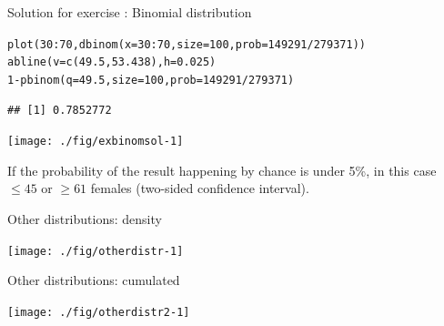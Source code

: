 \documentclass[xcolor=table,           xcolor=dvipsnames]{beamer}\usepackage[]{graphicx}\usepackage[]{color}
\makeatletter
\newcommand{\hlnum}[1]{\textcolor[rgb]{0,0,0}{#1}}
\newcommand{\hlopt}[1]{\textcolor[rgb]{0,0,0}{#1}}
\newcommand{\hlstd}[1]{\textcolor[rgb]{0,0,0}{#1}}
\newcommand{\hlkwc}[1]{\textcolor[rgb]{1,0,1}{#1}}
\newcommand{\hlkwd}[1]{\textcolor[rgb]{0,0,1}{#1}}
\newenvironment{kframe}{%
 \def\at@end@of@kframe{}%
 \ifinner\ifhmode%
  \def\at@end@of@kframe{\end{minipage}}%
  \begin{minipage}{\columnwidth}%
 \fi\fi%
 \def\FrameCommand##1{\hskip\@totalleftmargin \hskip-\fboxsep
 \colorbox{shadecolor}{##1}\hskip-\fboxsep
     \hskip-\linewidth \hskip-\@totalleftmargin \hskip\columnwidth}%
 \MakeFramed {\advance\hsize-\width
   \@totalleftmargin\z@ \linewidth\hsize
   \@setminipage}}%
 {\par\unskip\endMakeFramed%
 \at@end@of@kframe}
\newenvironment{knitrout}{}{} %
\newcounter{exercisecount}
\makeatother
\begin{document}

\begin{frame}[fragile]{Solution for exercise : Binomial distribution}
\begin{knitrout}\footnotesize
{}\color{fgcolor}\begin{kframe}
\begin{alltt}
\hlkwd{plot}\hlstd{(}\hlnum{30}\hlopt{:}\hlnum{70}\hlstd{,} \hlkwd{dbinom}\hlstd{(}\hlkwc{x}\hlstd{=}\hlnum{30}\hlopt{:}\hlnum{70}\hlstd{,} \hlkwc{size}\hlstd{=}\hlnum{100}\hlstd{,} \hlkwc{prob}\hlstd{=}\hlnum{149291}\hlopt{/}\hlnum{279371}\hlstd{))}
\hlkwd{abline}\hlstd{(}\hlkwc{v}\hlstd{=}\hlkwd{c}\hlstd{(}\hlnum{49.5}\hlstd{,} \hlnum{53.438}\hlstd{),} \hlkwc{h}\hlstd{=}\hlnum{0.025}\hlstd{)}
\hlnum{1}\hlopt{-}\hlkwd{pbinom}\hlstd{(}\hlkwc{q}\hlstd{=}\hlnum{49.5}\hlstd{,} \hlkwc{size}\hlstd{=}\hlnum{100}\hlstd{,} \hlkwc{prob}\hlstd{=}\hlnum{149291}\hlopt{/}\hlnum{279371}\hlstd{)}
\end{alltt}
\begin{verbatim}
## [1] 0.7852772
\end{verbatim}
\end{kframe}

{\centering \texttt{[image: ./fig/exbinomsol-1]} 

}



\end{knitrout}
If the probability of the result happening by chance is under 5\%, in this case $\leq 45$ or $\geq 61$  females (two-sided confidence interval).
\end{frame}

\begin{frame}[fragile]{Other distributions: density}
\begin{knitrout}
\color{fgcolor}

{\centering \texttt{[image: ./fig/otherdistr-1]} 

}



\end{knitrout}
\end{frame}


\begin{frame}[fragile]{Other distributions: cumulated}
\begin{knitrout}
\color{fgcolor}

{\centering \texttt{[image: ./fig/otherdistr2-1]} 

}



\end{knitrout}
\end{frame}
\end{document}
